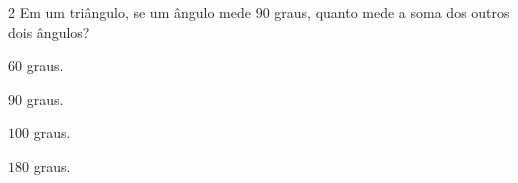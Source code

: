 {{{{%


\num{2}  Em um triângulo, se um ângulo mede $90$ graus, quanto mede a soma dos
outros dois ângulos?

\begin{escolha}
\item $60$ graus.
\item $90$ graus.
\item $100$ graus.
\item $180$ graus.
\end{escolha}



}}}}

